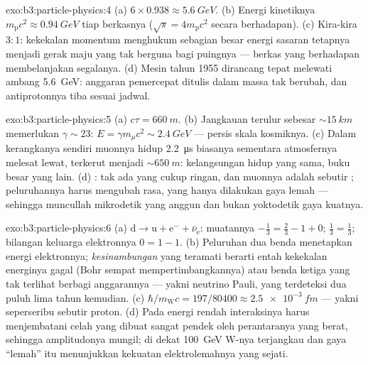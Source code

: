 \begin{solution}{exo:b3:particle-physics:4}
(a) $6\times0.938 \approx \qty{5.6}{GeV}$. (b) Energi kinetiknya
$m_{\text{p}}c^2 \approx \qty{0.94}{GeV}$ tiap berkasnya
($\sqrt s = 4m_{\text{p}}c^2$ secara berhadapan). (c) Kira-kira $3:1$:
kekekalan momentum menghukum sebagian besar energi sasaran tetapnya menjadi
gerak maju yang tak berguna bagi puingnya --- berkas yang berhadapan
membelanjakan segalanya. (d) Mesin tahun 1955 dirancang tepat melewati
ambang \qty{5.6}{GeV}: anggaran pemercepat ditulis dalam
massa tak berubah, dan antiprotonnya tiba sesuai jadwal.
\end{solution}

\begin{solution}{exo:b3:particle-physics:5}
(a) $c\tau = \qty{660}{m}$. (b) Jangkauan terulur sebesar
${\sim}\qty{15}{km}$ memerlukan $\gamma \sim 23$: $E = \gamma
m_\mu c^2 \sim \qty{2.4}{GeV}$ --- persis skala kosmiknya. (c)
Dalam kerangkanya sendiri muonnya hidup \qty{2.2}{\micro s} biasanya
sementara atmosfernya melesat lewat, terkerut menjadi
${\sim}\qty{650}{m}$: kelangsungan hidup yang sama, buku besar yang lain. (d) : tak ada  yang cukup ringan, dan muonnya adalah sebutir
; peluruhannya harus mengubah rasa, yang hanya dilakukan gaya lemah
--- sehingga muncullah mikrodetik yang anggun dan bukan
yoktodetik gaya kuatnya.
\end{solution}

\begin{solution}{exo:b3:particle-physics:6}
(a) $\text{d} \to \text{u} + \text{e}^- + \bar\nu_{\text{e}}$:
muatannya $-\tfrac13 = \tfrac23 - 1 + 0$; 
$\tfrac13 = \tfrac13$; bilangan keluarga elektronnya $0 = 1 - 1$. (b) Peluruhan
dua benda menetapkan energi elektronnya; \emph{kesinambungan} yang
teramati berarti entah kekekalan energinya gagal
(Bohr sempat mempertimbangkannya) atau benda ketiga yang tak terlihat berbagi
anggarannya --- yakni neutrino Pauli, yang terdeteksi dua puluh lima tahun kemudian.
(c) $\hbar/m_{\text{W}}c = 197/80400 \approx
\qty{2.5e-3}{fm}$ --- yakni seperseribu sebutir proton. (d) Pada energi
rendah interaksinya harus menjembatani celah yang dibuat sangat pendek oleh
perantaranya yang berat, sehingga amplitudonya mungil; di dekat
\qty{100}{GeV} W-nya terjangkau dan gaya ``lemah'' itu menunjukkan
kekuatan elektrolemahnya yang sejati.
\end{solution}

